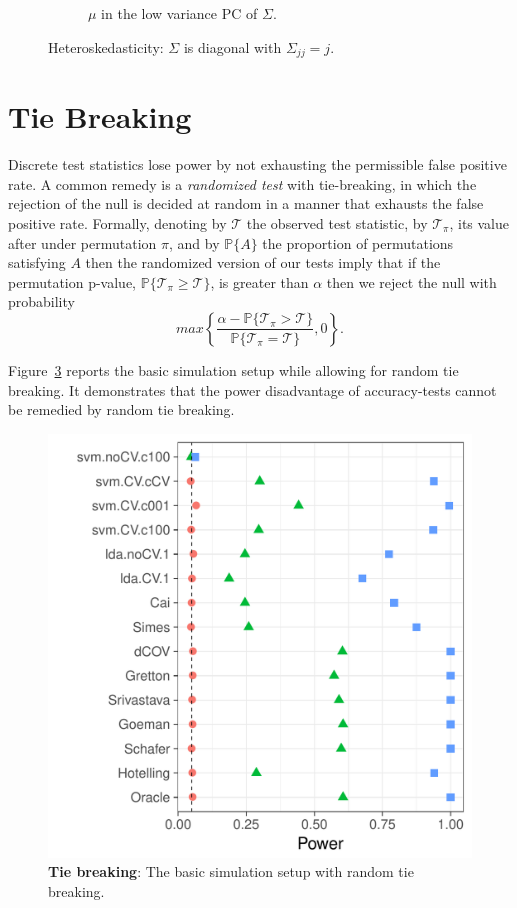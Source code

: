 \documentclass[]{bio}
\begin{document}
\begin{figure}[h]
\begin{subfigure}[t]{0.45\columnwidth}
		\caption{$\mu$ in the low variance PC of $\Sigma$.}  
		\label{fig:heteroskedastic_12}	
	\end{subfigure}
	\caption{Heteroskedasticity: $\Sigma$ is diagonal with $\Sigma_{jj}=j$.}	
	\label{fig:heteroskedastic}	
\end{figure}




\section{Tie Breaking}
\label{sec:ties}

Discrete test statistics lose power by not exhausting the permissible false positive rate. 
A common remedy is a \emph{randomized test} with tie-breaking, in which the rejection of the null is decided at random in a manner that exhausts the false positive rate. 
Formally, denoting by $\mathcal{T}$ the observed test statistic, by $\mathcal{T}_\pi$, its value after under permutation $\pi$, and by $\mathbb{P}\{A\}$ the proportion of permutations satisfying $A$ then the randomized version of our tests imply that if the permutation p-value, 
$\mathbb{P}\{\mathcal{T}_\pi \geq \mathcal{T}\}$, 
is greater than  $\alpha$ then we reject the null with probability 
$$ max\left\{\frac{\alpha - \mathbb{P}\{\mathcal{T}_\pi > \mathcal{T}\}}{\mathbb{P}\{\mathcal{T}_\pi = \mathcal{T}\}},0 \right\}.$$

Figure~\ref{fig:file33} reports the basic simulation setup while allowing for random tie breaking. 
It demonstrates that the power disadvantage of accuracy-tests cannot be remedied by random tie breaking.

\begin{figure}[ht]
	\centering
	\includegraphics[width=0.5\columnwidth]{art/file33}
	\caption{\textbf{Tie breaking}: The basic simulation setup with random tie breaking.}
	\label{fig:file33}
\end{figure}
\end{document}
